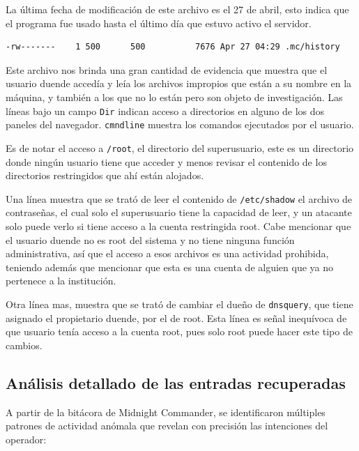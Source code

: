 \vspace{1em}
 
 La última fecha de modificación de este archivo es el 27 de abril,
esto indica que el programa fue usado hasta el último día que estuvo
activo el servidor.
 
 \vspace{1em}

\begin{lstlisting}[style=terminal]
-rw-------    1 500      500          7676 Apr 27 04:29 .mc/history
\end{lstlisting}

\vspace{1em}

 Este archivo nos brinda una gran cantidad de evidencia que muestra
que el usuario duende accedía y leía los archivos impropios que
están a su nombre en la máquina, y también a los que no lo están pero
son objeto de investigación. Las líneas bajo un campo \texttt{Dir} indican
acceso a directorios en alguno de los dos paneles del
navegador. \texttt{cmndline} muestra los comandos ejecutados por el usuario.

 Es de notar el acceso a \texttt{/root}, el directorio del superusuario, este
es un directorio donde ningún usuario tiene que acceder y menos
revisar el contenido de los directorios restringidos que ahí están
alojados.

 Una línea muestra que se trató de leer el contenido de \texttt{/etc/shadow} el
archivo de contraseñas, el cual solo el superusuario tiene la capacidad
de leer, y un atacante solo puede verlo si tiene acceso a la cuenta
restringida root. Cabe mencionar que el usuario duende no es root del
sistema y no tiene ninguna función administrativa, así que el acceso a
esos archivos es una actividad prohibida, teniendo además que
mencionar que esta es una cuenta de alguien que ya no pertenece a la institución.

Otra línea mas, muestra que se trató de cambiar el dueño de \texttt{dnsquery},
que tiene asignado el propietario duende, por el de
root. Esta línea es señal inequívoca de que usuario tenía acceso a la
cuenta root, pues solo root puede hacer este tipo de cambios.



\subsection{Análisis detallado de las entradas recuperadas}

A partir de la bitácora de Midnight Commander, se identificaron múltiples patrones de actividad anómala que revelan con precisión las intenciones del operador:

